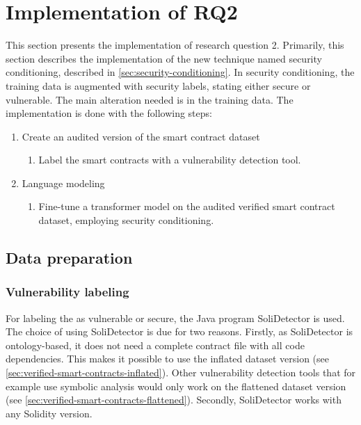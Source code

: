 \FloatBarrier

\section{Implementation of RQ2}
This section presents the implementation of research question 2. Primarily, this section describes the implementation of the new technique named security conditioning, described in \cref{sec:security-conditioning}. In security conditioning, the training data is augmented with security labels, stating either secure or vulnerable. The main alteration needed is in the training data. The implementation is done with the following steps:
\begin{enumerate}
    \item Create an audited version of the smart contract dataset
    \begin{enumerate}
        \item Label the smart contracts with a vulnerability detection tool.
    \end{enumerate}
    \item Language modeling
    \begin{enumerate}
        \item Fine-tune a transformer model on the audited verified smart contract dataset, employing security conditioning.
    \end{enumerate}
\end{enumerate}

\subsection{Data preparation}
\label{sec:data-preparation}

\subsubsection{Vulnerability labeling}
\label{sec:vulnerability-labeling}
For labeling the  as vulnerable or secure, the Java program SoliDetector  is used. The choice of using SoliDetector is due for two reasons. Firstly, as SoliDetector is ontology-based, it does not need a complete contract file with all code dependencies.  This makes it possible to use the inflated dataset version (see \cref{sec:verified-smart-contracts-inflated}). Other vulnerability detection tools that for example use symbolic analysis would only work on the flattened dataset version (see \cref{sec:verified-smart-contracts-flattened}). Secondly, SoliDetector works with any Solidity version. 

